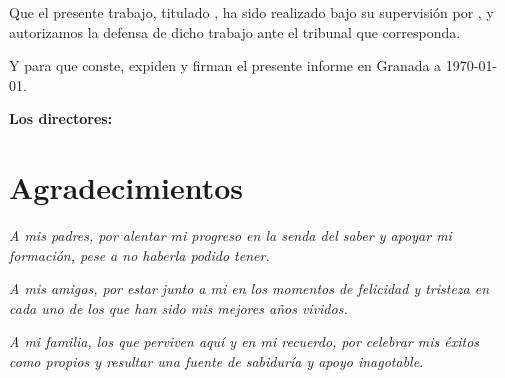 Que el presente trabajo, titulado \textit{\textbf{\myTitle}},
ha sido realizado bajo su supervisión por \textbf{\myName}, y autorizamos la defensa de dicho trabajo ante el tribunal
que corresponda.

\vspace{0.5cm}

Y para que conste, expiden y firman el presente informe en Granada a \today.

\vspace{1cm}

\textbf{Los directores:}

\vspace{5cm}

\noindent \textbf{\myProf}

\chapter*{Agradecimientos}
\thispagestyle{empty}

       \vspace{1cm}


\textit{A mis padres, por alentar mi progreso en la senda del saber y apoyar mi formación, pese a no haberla podido tener.}

\textit{A mis amigos, por estar junto a mi en los momentos de felicidad y tristeza en cada uno de los que han sido mis mejores años vividos.}

\textit{A mi familia, los que perviven aquí y en mi recuerdo, por celebrar mis éxitos como propios y resultar una fuente de sabiduría y apoyo inagotable.}

